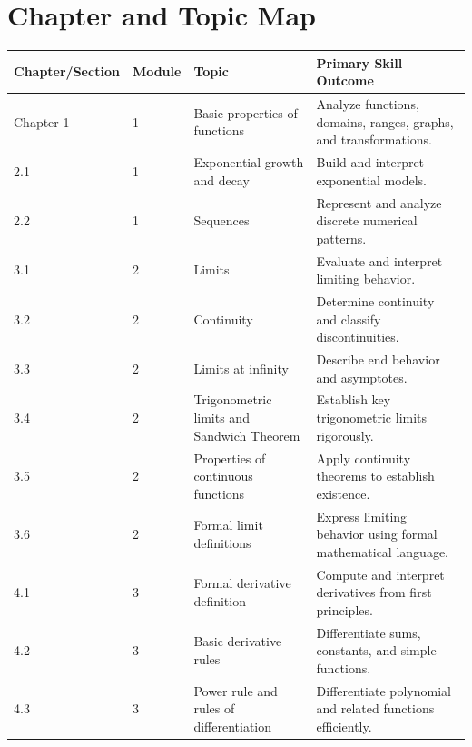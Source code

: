 \documentclass[11pt]{article}
\begin{document}
\section{Chapter and Topic Map}

\begin{longtable}{p{} p{} p{} p{}}
\toprule
\textbf{Chapter/Section} & \textbf{Module} & \textbf{Topic} & \textbf{Primary Skill Outcome} \\
\midrule
\endhead

Chapter 1 & 1 & Basic properties of functions & Analyze functions, domains, ranges, graphs, and transformations. \\

2.1 & 1 & Exponential growth and decay & Build and interpret exponential models. \\

2.2 & 1 & Sequences & Represent and analyze discrete numerical patterns. \\

3.1 & 2 & Limits & Evaluate and interpret limiting behavior. \\

3.2 & 2 & Continuity & Determine continuity and classify discontinuities. \\

3.3 & 2 & Limits at infinity & Describe end behavior and asymptotes. \\

3.4 & 2 & Trigonometric limits and Sandwich Theorem & Establish key trigonometric limits rigorously. \\

3.5 & 2 & Properties of continuous functions & Apply continuity theorems to establish existence. \\

3.6 & 2 & Formal limit definitions & Express limiting behavior using formal mathematical language. \\

4.1 & 3 & Formal derivative definition & Compute and interpret derivatives from first principles. \\

4.2 & 3 & Basic derivative rules & Differentiate sums, constants, and simple functions. \\

4.3 & 3 & Power rule and rules of differentiation & Differentiate polynomial and related functions efficiently. \\


\end{longtable}
\end{document}
